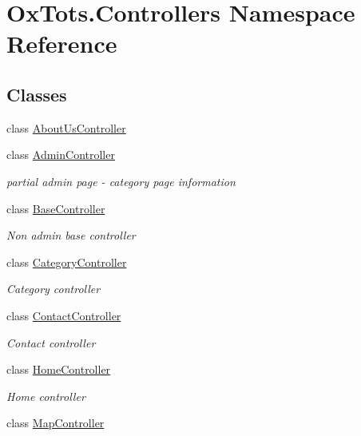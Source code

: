 \hypertarget{namespace_ox_tots_1_1_controllers}{}\section{Ox\+Tots.\+Controllers Namespace Reference}
\label{namespace_ox_tots_1_1_controllers}
\subsection*{Classes}
\begin{DoxyCompactItemize}
\item 
class \mbox{\hyperlink{class_ox_tots_1_1_controllers_1_1_about_us_controller}{About\+Us\+Controller}}
\item 
class \mbox{\hyperlink{class_ox_tots_1_1_controllers_1_1_admin_controller}{Admin\+Controller}}
\begin{DoxyCompactList}\small\item\em partial admin page -\/ category page information \end{DoxyCompactList}\item 
class \mbox{\hyperlink{class_ox_tots_1_1_controllers_1_1_base_controller}{Base\+Controller}}
\begin{DoxyCompactList}\small\item\em Non admin base controller \end{DoxyCompactList}\item 
class \mbox{\hyperlink{class_ox_tots_1_1_controllers_1_1_category_controller}{Category\+Controller}}
\begin{DoxyCompactList}\small\item\em Category controller \end{DoxyCompactList}\item 
class \mbox{\hyperlink{class_ox_tots_1_1_controllers_1_1_contact_controller}{Contact\+Controller}}
\begin{DoxyCompactList}\small\item\em Contact controller \end{DoxyCompactList}\item 
class \mbox{\hyperlink{class_ox_tots_1_1_controllers_1_1_home_controller}{Home\+Controller}}
\begin{DoxyCompactList}\small\item\em Home controller \end{DoxyCompactList}\item 
class \mbox{\hyperlink{class_ox_tots_1_1_controllers_1_1_map_controller}{Map\+Controller}}

\end{DoxyCompactItemize}
